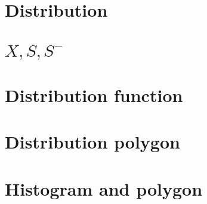 



\date{\today}
\maketitle
\tableofcontents 

\chapter{Distribution}


\chapter{$X,S,S^-$}




\chapter{Distribution function}
\begin{center}
  
\end{center}
\newpage
\begin{figure}[h]
\center{}
\end{figure}

\chapter{Distribution polygon}
\begin{figure}[h]
\center{}
\end{figure}

\chapter{Histogram and polygon}
\begin{figure}[h]
\center{}
\end{figure}





